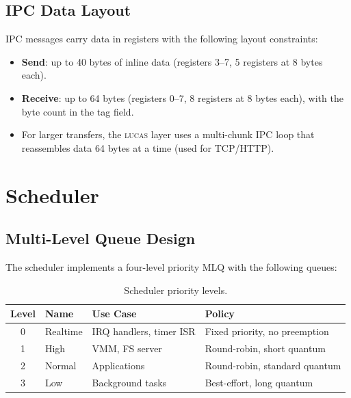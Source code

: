 \documentclass[11pt,a4paper,twoside]{report}
\theoremstyle{definition}
\newcommand{\LUCAS}{\textsc{lucas}}
\begin{document}
\section{IPC Data Layout}

IPC messages carry data in registers with the following layout constraints:

\begin{itemize}[leftmargin=1.4em]
  \item \textbf{Send}: up to 40 bytes of inline data (registers 3--7,
    5 registers at 8 bytes each).
  \item \textbf{Receive}: up to 64 bytes (registers 0--7, 8 registers at
    8 bytes each), with the byte count in the tag field.
  \item For larger transfers, the \LUCAS{} layer uses a multi-chunk IPC
    loop that reassembles data 64 bytes at a time (used for TCP/HTTP).
\end{itemize}


\chapter{Scheduler}
\label{ch:sched}

\section{Multi-Level Queue Design}

The scheduler implements a four-level priority MLQ with the following queues:

\begin{table}[H]
\centering
\caption{Scheduler priority levels.}
\begin{tabular}{c l l l}
\toprule
\textbf{Level} & \textbf{Name} & \textbf{Use Case} & \textbf{Policy} \\
\midrule
0 & Realtime & IRQ handlers, timer ISR & Fixed priority, no preemption \\
1 & High     & VMM, FS server          & Round-robin, short quantum \\
2 & Normal   & Applications            & Round-robin, standard quantum \\
3 & Low      & Background tasks        & Best-effort, long quantum \\
\bottomrule
\end{tabular}
\end{table}
\end{document}
